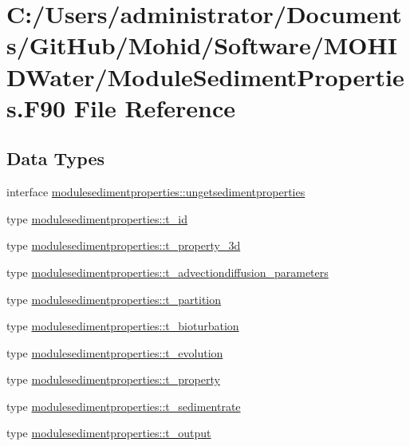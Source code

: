 \hypertarget{_module_sediment_properties_8_f90}{}\section{C\+:/\+Users/administrator/\+Documents/\+Git\+Hub/\+Mohid/\+Software/\+M\+O\+H\+I\+D\+Water/\+Module\+Sediment\+Properties.F90 File Reference}
\label{_module_sediment_properties_8_f90}
\subsection*{Data Types}
\begin{DoxyCompactItemize}
\item 
interface \mbox{\hyperlink{interfacemodulesedimentproperties_1_1ungetsedimentproperties}{modulesedimentproperties\+::ungetsedimentproperties}}
\item 
type \mbox{\hyperlink{structmodulesedimentproperties_1_1t__id}{modulesedimentproperties\+::t\+\_\+id}}
\item 
type \mbox{\hyperlink{structmodulesedimentproperties_1_1t__property__3d}{modulesedimentproperties\+::t\+\_\+property\+\_\+3d}}
\item 
type \mbox{\hyperlink{structmodulesedimentproperties_1_1t__advectiondiffusion__parameters}{modulesedimentproperties\+::t\+\_\+advectiondiffusion\+\_\+parameters}}
\item 
type \mbox{\hyperlink{structmodulesedimentproperties_1_1t__partition}{modulesedimentproperties\+::t\+\_\+partition}}
\item 
type \mbox{\hyperlink{structmodulesedimentproperties_1_1t__bioturbation}{modulesedimentproperties\+::t\+\_\+bioturbation}}
\item 
type \mbox{\hyperlink{structmodulesedimentproperties_1_1t__evolution}{modulesedimentproperties\+::t\+\_\+evolution}}
\item 
type \mbox{\hyperlink{structmodulesedimentproperties_1_1t__property}{modulesedimentproperties\+::t\+\_\+property}}
\item 
type \mbox{\hyperlink{structmodulesedimentproperties_1_1t__sedimentrate}{modulesedimentproperties\+::t\+\_\+sedimentrate}}
\item 
type \mbox{\hyperlink{structmodulesedimentproperties_1_1t__output}{modulesedimentproperties\+::t\+\_\+output}}

\end{DoxyCompactItemize}
